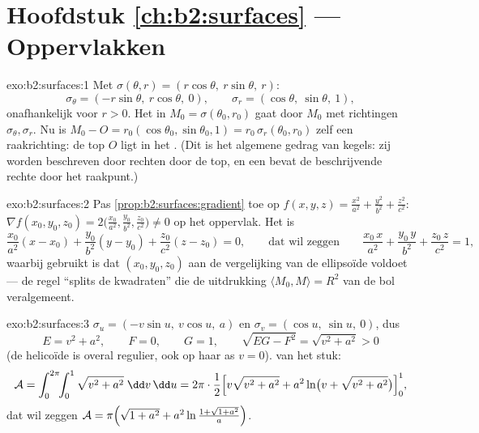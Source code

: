 \section*{Hoofdstuk \ref{ch:b2:surfaces} --- Oppervlakken}

\begin{solution}{exo:b2:surfaces:1}
Met $\sigma(\theta, r) = (r\cos\theta,\ r\sin\theta,\ r)$:
\[
\sigma_\theta = (-r\sin\theta,\ r\cos\theta,\ 0),
\qquad
\sigma_r = (\cos\theta,\ \sin\theta,\ 1),
\]
onafhankelijk voor $r > 0$. Het  in $M_0 =
\sigma(\theta_0, r_0)$ gaat door $M_0$ met richtingen
$\sigma_\theta, \sigma_r$. Nu is $M_0 - O = r_0(\cos\theta_0,
\sin\theta_0, 1) = r_0\,\sigma_r(\theta_0, r_0)$ zelf een
raakrichting: de top $O$ ligt in het . (Dit is het algemene
gedrag van kegels: zij worden beschreven door rechten door de top,
en een  bevat de beschrijvende rechte door het raakpunt.)
\end{solution}

\begin{solution}{exo:b2:surfaces:2}
Pas \cref{prop:b2:surfaces:gradient} toe op $f(x,y,z) =
\frac{x^2}{a^2} + \frac{y^2}{b^2} + \frac{z^2}{c^2}$: $\nabla
f(x_0,y_0,z_0) = 2\bigl(\frac{x_0}{a^2}, \frac{y_0}{b^2},
\frac{z_0}{c^2}\bigr) \neq 0$ op het oppervlak. Het  is
\[
\frac{x_0}{a^2}(x - x_0) + \frac{y_0}{b^2}(y - y_0)
+ \frac{z_0}{c^2}(z - z_0) = 0,
\qquad\text{dat wil zeggen}\qquad
\frac{x_0\,x}{a^2} + \frac{y_0\,y}{b^2} + \frac{z_0\,z}{c^2} = 1,
\]
waarbij gebruikt is dat $(x_0, y_0, z_0)$ aan de vergelijking van
de ellipsoïde voldoet --- de regel ``splits de kwadraten'' die de
uitdrukking $\langle M_0, M \rangle = R^2$ van de bol
veralgemeent.
\end{solution}

\begin{solution}{exo:b2:surfaces:3}
$\sigma_u = (-v\sin u,\ v\cos u,\ a)$ en $\sigma_v = (\cos u,\
\sin u,\ 0)$, dus
\[
E = v^2 + a^2, \qquad F = 0, \qquad G = 1,
\qquad
\sqrt{EG - F^2} = \sqrt{v^2 + a^2} > 0
\]
(de helicoïde is overal regulier, ook op haar as $v = 0$).
 van het stuk:
\[
\mathcal{A} = \int_0^{2\pi}\!\!\int_0^1
\sqrt{v^2 + a^2}\;\dd v\,\dd u
= 2\pi\cdot\frac12\Bigl[v\sqrt{v^2 + a^2}
+ a^2\ln\bigl(v + \sqrt{v^2 + a^2}\bigr)\Bigr]_0^1 ,
\]
dat wil zeggen $\mathcal{A} = \pi\Bigl(\sqrt{1 + a^2} +
a^2\ln\frac{1 + \sqrt{1 + a^2}}{a}\Bigr)$.
\end{solution}

